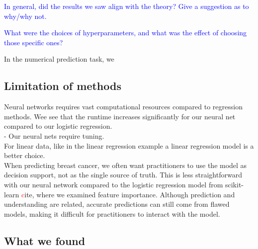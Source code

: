 \textcolor{blue}{In general, did the results we saw align with the theory? Give a suggestion as to why/why not.}

\textcolor{blue}{What were the choices of hyperparameters, and what was the effect of choosing those specific ones?}

In the numerical prediction task, we 

\subsection{Limitation of methods}
Neural networks requires vast computational resources compared to regression methods. Wee see that the runtime increases significantly for our neural net compared to our logistic regression. \\

-  Our neural nets require tuning. \\

For linear data, like in the linear regression example
a linear regression model is a better choice. 
\\
When predicting breast cancer, we often want practitioners to use the model as decision support, not as the single source of truth. This is less straightforward with our neural network compared to the logistic regression model from scikit-learn \textcolor{red} cite, where we examined feature importance. Although prediction and understanding are related, accurate predictions can still come from flawed models, making it difficult for practitioners to interact with the model.
\subsection{What we found}